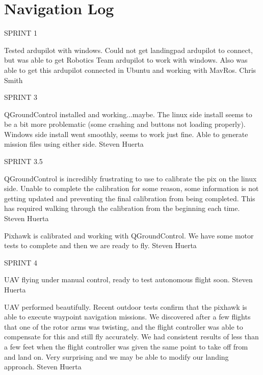 \section{Navigation Log}

\begin{description}

\item SPRINT 1

\item [10/03/15]  Tested ardupilot with windows. Could not get landingpad ardupilot to connect, but was able to get Robotics Team ardupilot to work with windows. Also was able to get this ardupilot connected in Ubuntu and working with MavRos. \hfill{Chris Smith}

\item SPRINT 3

\item [11/16/15]  QGroundControl installed and working...maybe. The linux side install seems to be a bit more problematic (some crashing and buttons not loading properly). Windows side install went smoothly, seems to work just fine. Able to generate mission files using either side.  \hfill{Steven Huerta}

\item SPRINT 3.5

\item [12/21/15]  QGroundControl is incredibly frustrating to use to calibrate the pix on the linux side. Unable to complete the calibration for some reason, some information is not getting updated and preventing the final calibration from being completed. This has required walking through the calibration from the beginning each time.  \hfill{Steven Huerta}

\item [1/4/16]  Pixhawk is calibrated and working with QGroundControl. We have some motor tests to complete and then we are ready to fly. \hfill{Steven Huerta}

\item SPRINT 4

\item [1/18/16]  UAV flying under manual control, ready to test autonomous flight soon. \hfill{Steven Huerta}

\item [1/25/16]  UAV performed beautifully. Recent outdoor tests confirm that the pixhawk is able to execute waypoint navigation missions. We discovered after a few flights that one of the rotor arms was twisting, and the flight controller was able to compensate for this and still fly accurately. We had consistent results of less than a few feet when the flight controller was given the same point to take off from and land on. Very surprising and we may be able to modify our landing approach.  \hfill{Steven Huerta}


\end{description}
